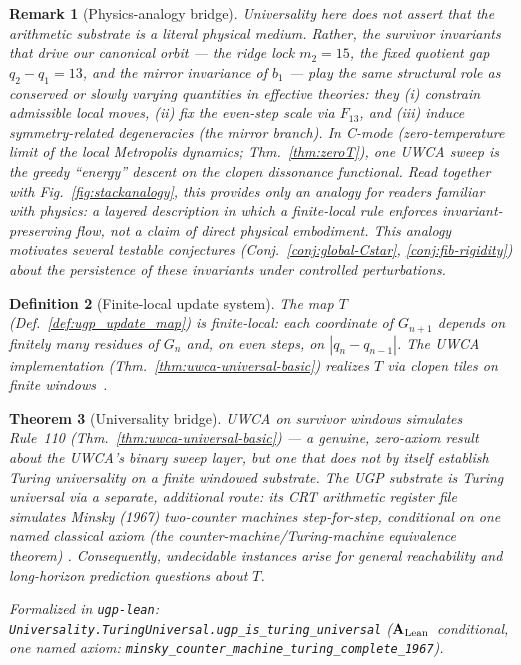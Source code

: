 \documentclass[12pt]{article}
\newtheorem{theorem}{Theorem}[section]
\newtheorem{definition}[theorem]{Definition}
\newtheorem{remark}[theorem]{Remark}
\numberwithin{equation}{section}
\newcommand{\CatAL}{\ensuremath{\textbf{A}_{\rm Lean}}}
\begin{document}
\begin{remark}[Physics-analogy bridge]\label{rem:physics-analogy}
Universality here does \emph{not} assert that the arithmetic substrate is a literal physical medium. Rather, the survivor invariants that drive our canonical orbit --- the ridge lock $m_2{=}15$, the fixed quotient gap $q_2{-}q_1{=}13$, and the mirror invariance of $b_1$ --- play the same structural role as conserved or slowly varying quantities in effective theories: they (i) constrain admissible local moves, (ii) fix the even-step scale via $F_{13}$, and (iii) induce symmetry-related degeneracies (the mirror branch). In C-mode (zero-temperature limit of the local Metropolis dynamics; Thm.~\ref{thm:zeroT}), one UWCA sweep is the greedy ``energy'' descent on the clopen dissonance functional. Read together with Fig.~\ref{fig:stackanalogy}, this provides only an \emph{analogy} for readers familiar with physics: a layered description in which a finite-local rule enforces invariant-preserving flow, not a claim of direct physical embodiment. This analogy motivates several testable conjectures (Conj.~\ref{conj:global-Cstar}, \ref{conj:fib-rigidity}) about the persistence of these invariants under controlled perturbations.
\end{remark}


\begin{definition}[Finite-local update system]\label{def:finite-local}
The map $T$ (Def.~\ref{def:ugp_update_map}) is \emph{finite-local}: each coordinate of $G_{n+1}$ depends on finitely many residues of $G_n$ and, on even steps, on $|q_n-q_{n-1}|$. The UWCA implementation (Thm.~\ref{thm:uwca-universal-basic}) realizes $T$ via clopen tiles on finite windows~\cite{SpivackUGPFormalization,ugp-lean}.
\end{definition}

%
\begin{theorem}[Universality bridge]\label{thm:uwca-bridge}
UWCA on survivor windows simulates Rule~110 (Thm.~\ref{thm:uwca-universal-basic}) --- a
genuine, zero-axiom result about the UWCA's binary sweep layer, but one that does not
by itself establish Turing universality on a finite windowed substrate.  The UGP
substrate is Turing universal via a separate, additional route: its CRT arithmetic
register file simulates Minsky (1967) two-counter machines step-for-step, conditional
on one named classical axiom (the counter-machine/Turing-machine equivalence theorem)
\cite{SpivackUGPFormalization,ugp-lean}.  Consequently, undecidable instances arise for
general reachability and long-horizon prediction questions about $T$.

\noindent\emph{Formalized in} \texttt{ugp-lean}: \texttt{Universality.TuringUniversal.ugp\_is\_turing\_universal}
(\CatAL\ conditional, one named axiom: \texttt{minsky\_counter\_machine\_turing\_complete\_1967}).
\end{theorem}
\end{document}
